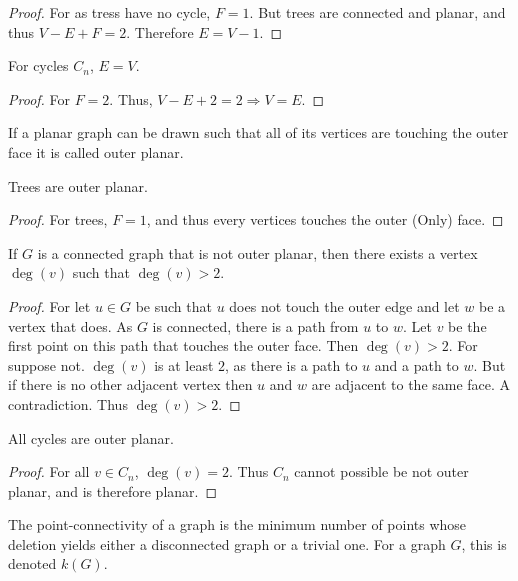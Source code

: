         \begin{proof}
        For as tress have no cycle, $F=1$. But trees are connected and planar, and thus $V-E+F = 2$. Therefore $E=V-1$.
        \end{proof}
        \begin{corollary}
        For cycles $C_n$, $E=V$.
        \end{corollary}
        \begin{proof}
        For $F=2$. Thus, $V-E+2=2\Rightarrow V=E$.
        \end{proof}
        \begin{definition}
        If a planar graph can be drawn such that all of its vertices are touching the outer face it is called outer planar.
        \end{definition}
        \begin{corollary}
        Trees are outer planar.
        \end{corollary}
        \begin{proof}
        For trees, $F=1$, and thus every vertices touches the outer (Only) face.
        \end{proof}
        \begin{lemma}
        If $G$ is a connected graph that is not outer planar, then there exists a vertex $\deg(v)$ such that $\deg(v)>2$.
        \end{lemma}
        \begin{proof}
        For let $u \in G$ be such that $u$ does not touch the outer edge and let $w$ be a vertex that does. As $G$ is connected, there is a path from $u$ to $w$. Let $v$ be the first point on this path that touches the outer face. Then $\deg(v)>2$. For suppose not. $\deg(v)$ is at least $2$, as there is a path to $u$ and a path to $w$. But if there is no other adjacent vertex then $u$ and $w$ are adjacent to the same face. A contradiction. Thus $\deg(v)>2$.
        \end{proof}
        \begin{corollary}
        All cycles are outer planar.
        \end{corollary}
        \begin{proof}
        For all $v\in C_n$, $\deg(v)=2$. Thus $C_n$ cannot possible be not outer planar, and is therefore planar.
        \end{proof}
        \begin{definition}
        The point-connectivity of a graph is the minimum number of points whose deletion yields either a disconnected graph or a trivial one. For a graph $G$, this is denoted $k(G)$.
        \end{definition}
